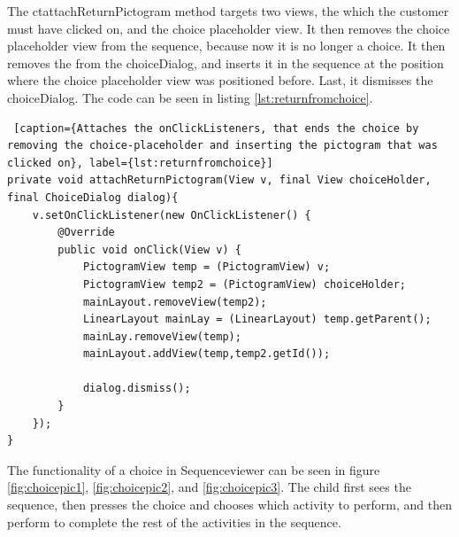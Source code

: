 The ct{attachReturnPictogram} method targets two views, the  which the customer must have clicked on, and the choice placeholder view. It then removes the choice placeholder view from the sequence, because now it is no longer a choice. It then removes the  from the choiceDialog, and inserts it in the sequence at the position where the choice placeholder view was positioned before. Last, it dismisses the choiceDialog.  The code can be seen in listing \ref{lst:returnfromchoice}.

\begin{lstlisting} [caption={Attaches the onClickListeners, that ends the choice by removing the choice-placeholder and inserting the pictogram that was clicked on}, label={lst:returnfromchoice}]
private void attachReturnPictogram(View v, final View choiceHolder, final ChoiceDialog dialog){
	v.setOnClickListener(new OnClickListener() {
		@Override
		public void onClick(View v) {
			PictogramView temp = (PictogramView) v;
			PictogramView temp2 = (PictogramView) choiceHolder;
			mainLayout.removeView(temp2);
			LinearLayout mainLay = (LinearLayout) temp.getParent();
			mainLay.removeView(temp);
			mainLayout.addView(temp,temp2.getId());

			dialog.dismiss();
		}
	});
}
\end{lstlisting}

The functionality of a choice in Sequenceviewer can be seen in figure \ref{fig:choicepic1}, \ref{fig:choicepic2}, and \ref{fig:choicepic3}. The child first sees the sequence, then presses the choice and chooses which activity to perform, and then perform to complete the rest of the activities in the sequence.


